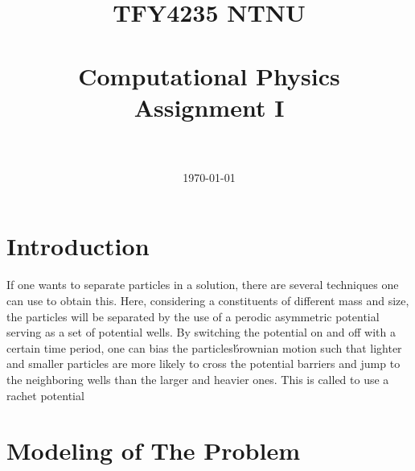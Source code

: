 \documentclass[11pt,a4paper]{article}
\title{	
\normalfont \normalsize 
\textsc{TFY4235 NTNU} \\ [25pt] %
\horrule{0.5pt} \\[0.4cm] %
\huge Computational Physics \\ Assignment I \\ %
\horrule{2pt} \\[0.5cm] %
}
\author{\AuthorName } %
\date{\normalsize\today} %
\begin{document}
\maketitle
\listoftodos{}
%
\begin{abstract}

\end{abstract}
%
\section{Introduction}
If one wants to separate particles in a solution, there are several techniques one can use to obtain this. 
Here, considering a constituents of different mass and size, the particles will be separated by the use 
of a perodic asymmetric potential serving as a set of potential wells.
By switching the potential on and off with a certain time period, one can bias the particles\' brownian motion
such that lighter and smaller particles are more likely to cross the potential barriers and jump to the 
neighboring wells than the larger and heavier ones. This is called to use a rachet potential

\section{Modeling of The Problem}
\end{document}
